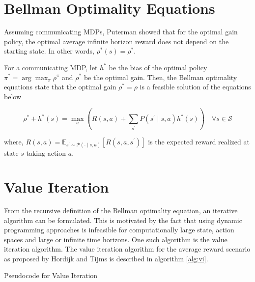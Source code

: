 \section{Bellman Optimality Equations}

Assuming communicating MDPs, Puterman \cite{puterman_chapter_1990} showed that for the optimal gain policy, the optimal average infinite horizon reward does not depend on the starting state. In other words, $\rho^*(s) = \rho^*$.

For a communicating MDP, let $h^*$ be the bias of the optimal policy $\pi^* = \arg \max_\pi \rho^\pi$ and $\rho^*$ be the optimal gain. 
Then, the Bellman optimality equations state that the optimal gain $\rho^* = \rho$ is a feasible solution of the equations below 

\begin{equation}
    \rho^* + h^*(s) = \max_a \left( R(s, a) + \sum_{s^\prime} P(s^\prime \mid s, a) h^*(s) \right) \quad \forall s \in \mathcal{S}
\end{equation}

where, $R(s,a) = \mathbb{E}_{s^\prime \sim \mathcal{P}(\cdot \mid s, a)}\left[ R(s, a, s^\prime) \right]$ is the expected reward realized at state $s$ taking action $a$.

\section{Value Iteration}

From the recursive definition of the Bellman optimality equation, an iterative algorithm can be formulated. 
This is motivated by the fact that using dynamic programming approaches is infeasible for computationally large state, action spaces and large or infinite time horizons.
One such algorithm is the value iteration algorithm. The value iteration algorithm for the average reward scenario as proposed by Hordijk and Tijms \cite{hordijk_modified_1975} is described in algorithm \ref{alg:vi}.

\begin{algorithm}[!htbp]
    
    
    \BlankLine
    \BlankLine
    \caption{Pseudocode for Value Iteration}\label{alg:vi}
\end{algorithm}


